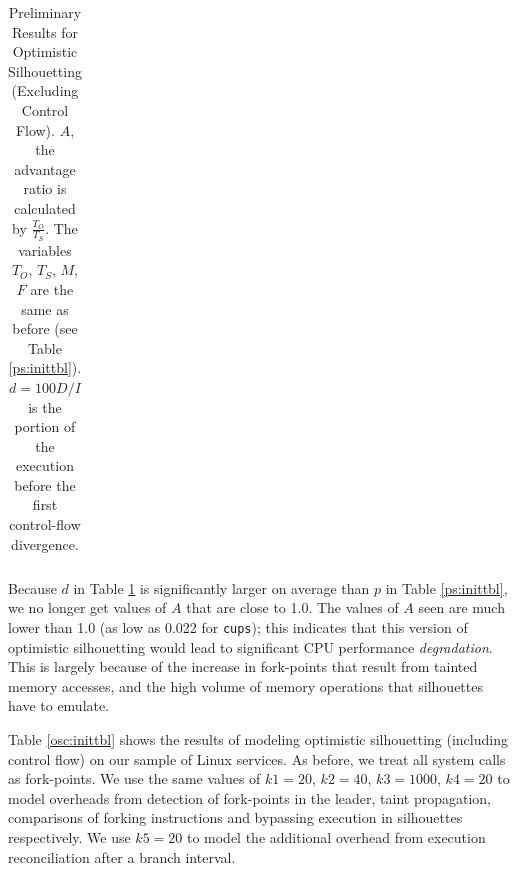 \begin{table} [h]
\begin{center}
\begin{tabular}{|l||c|c||c||c|c|c||c||c|}
\end{tabular}
\caption{Preliminary Results for Optimistic Silhouetting (Excluding Control Flow). \newline 
  $A$, the advantage ratio is calculated by $\frac{T_O}{T_S}$.
  The variables $T_O$, $T_S$, $M$, $F$ are the same as before (see Table \ref{ps:inittbl}).
  $d = 100D/I$ is the portion of the execution before the first control-flow divergence. }
\label{osnc:inittbl}
\end{center}
\end{table}

\noindent Because $d$ in Table \ref{osnc:inittbl} is significantly larger on average than $p$ in Table \ref{ps:inittbl},
we no longer get values of $A$ that are close to 1.0. The values of $A$ seen are much
lower than 1.0 (as low as 0.022 for \texttt{cups}); this indicates
that this version of optimistic silhouetting would lead to 
significant CPU performance {\em degradation}. This is largely
because of the increase in fork-points 
that result from tainted memory accesses,
and the high volume of memory operations that silhouettes
have to emulate.

 \newline
Table \ref{osc:inittbl} shows the results of modeling 
optimistic silhouetting (including control flow) on our sample of Linux services.
As before, we treat all system calls as fork-points. We use the same values of $k1 = 20$, $k2 = 40$, $k3 = 1000$, $k4 = 20$
to model overheads from detection of fork-points in the leader,
taint propagation, comparisons of forking instructions and
bypassing execution in silhouettes respectively.
We use $k5 = 20$ to model the additional
overhead from execution reconciliation
after a branch interval.


